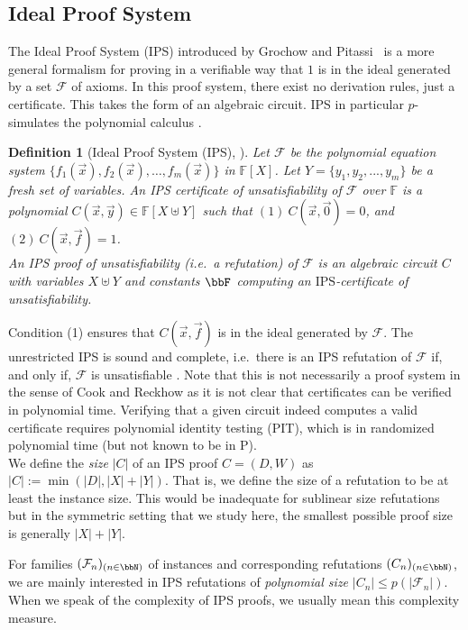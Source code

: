 \documentclass[10pt,a4paper]{article}
\newtheorem{definition}[theorem]{Definition}
\newcommand{\IPS}{\mathrm{IPS}}
\newcommand{\Ff}{{\cal F}}
\newcommand{\Field}{\ensuremath{\mathbb{F}}}
\newcommand{\Circ}{C} %
\newcommand{\F}{\ensuremath{\mathcal{F}}}
\begin{document}
	
	
	
	\subsection{Ideal Proof System}
	\label{sec:IPS}
	The Ideal Proof System (IPS) introduced by Grochow and Pitassi~\cite{IPS} is a more general formalism for proving in a verifiable way that $1$ is in the ideal generated by a set $\F$ of axioms. In this proof system, there exist no derivation rules, just a certificate. This takes the form of an algebraic circuit. IPS in particular $p$-simulates the polynomial calculus \cite[Proposition 3.4]{IPS}.
	\begin{definition}[Ideal Proof System (IPS), \cite{IPS}]
		Let $\F$ be the polynomial equation system $\{f_1(\vec x), f_2(\vec x), \ldots,f_m(\vec x)\}$
		in $\Field[X]$.
		Let $Y = \{y_1, y_2,...,y_m\}$ be a fresh set of variables.
		An \emph{IPS certificate} of unsatisfiability of $\F$ over $\Field$ is a polynomial
		$C(\vec x, \vec y) \in \Field[X \uplus Y]$ such that $(1) \ C(\vec x, \vec 0 ) = 0$, and $(2) \ C(\vec x, \vec f ) = 1$.\\
		An \emph{IPS proof} of unsatisfiability (i.e.\ a \emph{refutation}) of $\F$ is an algebraic circuit $\Circ$ with variables $X \uplus Y$ and constants $\bbF$ computing an $\IPS$-certificate of unsatisfiability.
	\end{definition}
	Condition (1) ensures that $C(\vec x, \vec f)$ is in the ideal generated by $\F$.
	The unrestricted IPS is sound and complete, i.e.\ there is an  IPS refutation of $\F$ if, and only if, $\F$ is unsatisfiable \cite{IPS}.  Note that this is not necessarily a proof system in the sense of Cook and Reckhow as it is not clear that certificates can be verified in polynomial time.   Verifying that a given circuit indeed computes a valid certificate requires polynomial identity testing (PIT), which is in randomized polynomial time (but not known to be in P).
	\\
	We define the \emph{size} $|C|$ of an IPS proof $C = (D,W)$ as 
	$
	|C| := \min(|D|, |X| + |Y|).
	$
	That is, we define the size of a refutation to be at least the instance size. 
	This would be inadequate for sublinear size refutations but in the symmetric setting that we study here, the smallest possible proof size is generally $|X| + |Y|$.
	
	For families $(\Ff_n)_{(n \in \bbN)}$ of instances and corresponding refutations $(C_n)_{(n \in \bbN)}$, we are mainly interested in IPS refutations of \emph{polynomial size} $|C_n| \leq p(|\F_n|)$.
	When we speak of the complexity of IPS proofs, we usually mean this complexity measure.
	
\end{document}
